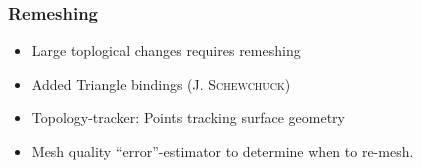\documentclass[11pt]{beamer} %
\newcommand{\roughcite}[1]{\textsc{#1}}
\begin{document}
\begin{frame}
\frametitle{Remeshing}
 \begin{itemize}
  \item Large toplogical changes requires remeshing
  \item Added Triangle bindings (\roughcite{J. Schewchuck})
  \item Topology-tracker: Points tracking surface geometry
  \item Mesh quality ``error''-estimator to determine when to re-mesh.
 \end{itemize}
\end{frame}
\end{document}
